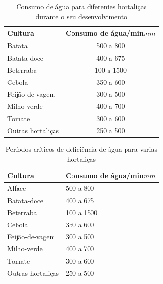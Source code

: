 \begin{table}[]
	\centering
	\caption{Consumo de \'{a}gua para diferentes hortaliças durante o seu desenvolvimento}
	\label{table:consumo1}
	\begin{tabular}{lc}
		\hline
		Cultura	& Consumo de água/min\(mm\)	\\ 
		\hline
		Batata				& 500 a 800 \\
		Batata-doce			& 400 a 675 \\
		Beterraba			& 100 a 1500 \\
		Cebola				& 350 a 600 \\
		Feijão-de-vagem		& 300 a 500 \\
		Milho-verde			& 400 a 700 \\
		Tomate				& 300 a 600 \\
		Outras hortaliças	& 250 a 500 \\ \hline
	\end{tabular}
\end{table}

\begin{table}[]
	\centering
	\caption{Períodos críticos de deficiência de água para v\'{a}rias hortaliças}
	\label{table:periodocritico}
	\begin{tabular}{ll}
		\hline
		Cultura	& Consumo de água/min\(mm\)\\ 
		\hline
		Alface				& 500 a 800 \\
		Batata-doce			& 400 a 675 \\
		Beterraba			& 100 a 1500 \\
		Cebola				& 350 a 600 \\
		Feijão-de-vagem		& 300 a 500 \\
		Milho-verde			& 400 a 700 \\
		Tomate				& 300 a 600 \\
		Outras hortaliças	& 250 a 500 \\
		\hline
	\end{tabular}
\end{table}

